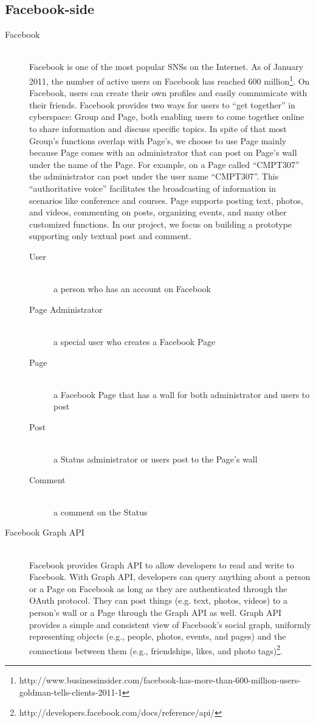 \subsection{Facebook-side}
\begin{description}
	\item[Facebook] \hfill \\
	Facebook is one of the most popular SNSs on the Internet. As of January 2011, the number of active users on Facebook has reached 600 million\footnote{http://www.businessinsider.com/facebook-has-more-than-600-million-users-goldman-tells-clients-2011-1}. On Facebook, users can create their own profiles and easily communicate with their friends. Facebook provides two ways for users to ``get together'' in cyberspace: Group and Page, both enabling users to come together online to share information and discuss specific topics. In spite of that most Group's functions overlap with Page's, we choose to use Page mainly because Page comes with an administrator that can post on Page's wall under the name of the Page. For example, on a Page called ``CMPT307'' the administrator can post under the user name ``CMPT307''. This ``authoritative voice'' facilitates the broadcasting of information in scenarios like conference and courses. Page supports posting text, photos, and videos, commenting on posts, organizing events, and many other customized functions. In our project, we focus on building a prototype supporting only textual post and comment.
	\begin{description}
		\item[User] \hfill \\
		a person who has an account on Facebook
		\item[Page Administrator] \hfill \\
		a special user who creates a Facebook Page
		\item[Page] \hfill \\
		a Facebook Page that has a wall for both administrator and users to post
		\item[Post] \hfill \\
		 a Status administrator or users post to the Page's wall
		\item[Comment] \hfill \\ 
		 a comment on the Status
	\end{description}
	\item[Facebook Graph API] \hfill \\ 
	Facebook provides Graph API to allow developers to read and write to Facebook. With Graph API, developers can query anything about a person or a Page on Facebook as long as they are authenticated through the OAuth protocol. They can post things (e.g. text, photos, videos) to a person's wall or a Page through the Graph API as well. Graph API provides a simple and consistent view of Facebook's social graph, uniformly representing objects (e.g., people, photos, events, and pages) and the connections between them (e.g., friendships, likes, and photo tags)\footnote{http://developers.facebook.com/docs/reference/api/}.
\end{description}

